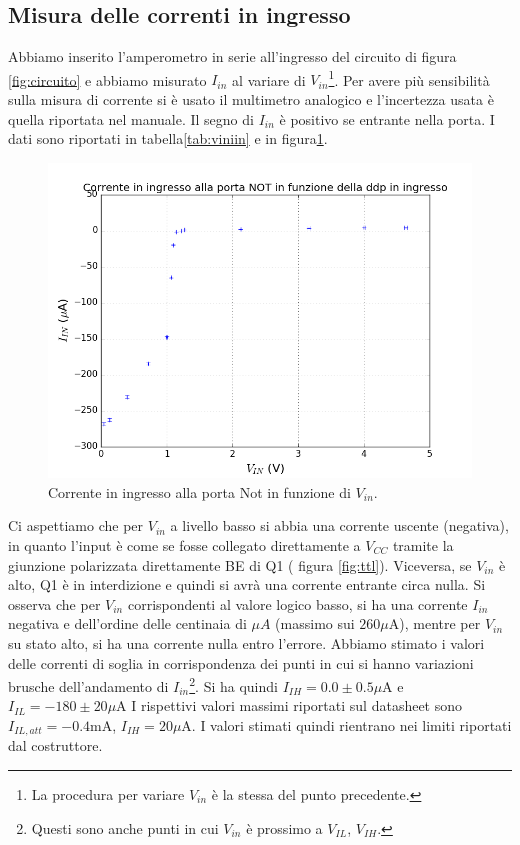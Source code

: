 \documentclass[10pt,a4paper]{article}
\begin{document}
\subsection{Misura delle correnti in ingresso}
Abbiamo inserito l'amperometro in serie all'ingresso del circuito di figura \ref{fig:circuito} e abbiamo misurato $I_{in}$ al variare di $V_{in}$\footnote{La procedura per variare $V_{in}$ è la stessa del punto precedente.}. Per avere più sensibilità sulla misura di corrente si è usato il multimetro analogico e l'incertezza usata è quella riportata nel manuale. Il segno di $I_{in}$ è positivo se entrante nella porta.
I dati sono riportati in tabella\ref{tab:viniin} e in figura\ref{fig:viniin}.
\begin{figure}[!htb]
\centering
\includegraphics[scale=0.9]{viniin.png}
\caption{Corrente in ingresso alla porta Not in funzione di $V_{in}$.\label{fig:viniin}}
\end{figure}
Ci aspettiamo che per $V_{in}$ a livello basso si abbia una corrente uscente (negativa), in quanto l'input è come se fosse collegato direttamente a $V_{CC}$ tramite la giunzione polarizzata direttamente BE di Q1 ( figura \ref{fig:ttl}). Viceversa, se $V_{in}$ è alto, Q1 è in interdizione e quindi si avrà una corrente entrante circa nulla.
Si osserva che per $V_{in}$ corrispondenti al valore logico basso, si ha una corrente $I_{in}$ negativa e dell'ordine delle centinaia di $\mu A$ (massimo sui $260\mu \mbox{A}$), mentre per $V_{in}$ su stato alto, si ha una corrente nulla entro l'errore.
Abbiamo stimato i valori delle correnti di soglia in corrispondenza dei punti in cui si hanno variazioni brusche dell'andamento di $I_{in}$\footnote{Questi sono anche punti in cui $V_{in}$ è prossimo a $V_{IL}$, $V_{IH}$.}.
Si ha quindi $I_{IH}=0.0\pm0.5\mu \mbox{A}$ e $I_{IL}=-180\pm20\mu\mbox{A}$
I rispettivi valori massimi riportati sul datasheet sono $I_{IL,att}=-0.4\mbox{mA}$, $I_{IH}=20\mu\mbox{A}$. 
I valori stimati quindi rientrano nei limiti riportati dal costruttore. 
\end{document}
